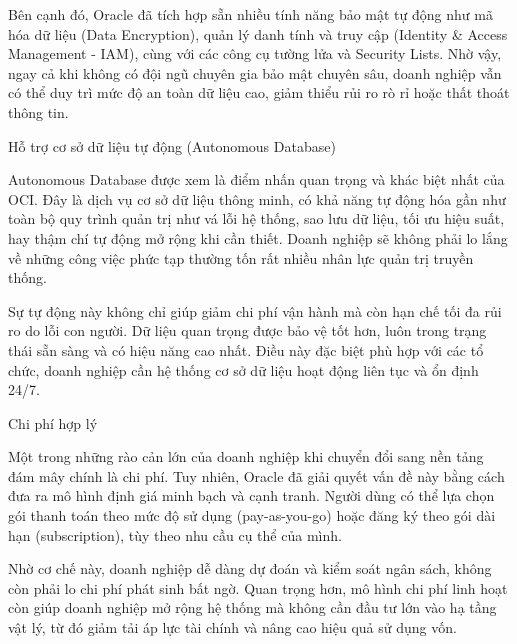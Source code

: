 \begin{myitem}
\begin{mysubitem}
    \item Bên cạnh đó, Oracle đã tích hợp sẵn nhiều tính năng bảo mật tự động như mã hóa dữ liệu (Data Encryption), quản lý danh tính và truy cập (Identity \& Access Management - IAM), cùng với các công cụ tường lửa và Security Lists. Nhờ vậy, ngay cả khi không có đội ngũ chuyên gia bảo mật chuyên sâu, doanh nghiệp vẫn có thể duy trì mức độ an toàn dữ liệu cao, giảm thiểu rủi ro rò rỉ hoặc thất thoát thông tin.
    
  \end{mysubitem}

\item Hỗ trợ cơ sở dữ liệu tự động (Autonomous Database)

  \begin{mysubitem}
    \item Autonomous Database được xem là điểm nhấn quan trọng và khác biệt nhất của OCI. Đây là dịch vụ cơ sở dữ liệu thông minh, có khả năng tự động hóa gần như toàn bộ quy trình quản trị như vá lỗi hệ thống, sao lưu dữ liệu, tối ưu hiệu suất, hay thậm chí tự động mở rộng khi cần thiết. Doanh nghiệp sẽ không phải lo lắng về những công việc phức tạp thường tốn rất nhiều nhân lực quản trị truyền thống.
    
    \item Sự tự động này không chỉ giúp giảm chi phí vận hành mà còn hạn chế tối đa rủi ro do lỗi con người. Dữ liệu quan trọng được bảo vệ tốt hơn, luôn trong trạng thái sẵn sàng và có hiệu năng cao nhất. Điều này đặc biệt phù hợp với các tổ chức, doanh nghiệp cần hệ thống cơ sở dữ liệu hoạt động liên tục và ổn định 24/7.
    
  \end{mysubitem}

\item Chi phí hợp lý

  \begin{mysubitem}
    \item Một trong những rào cản lớn của doanh nghiệp khi chuyển đổi sang nền tảng đám mây chính là chi phí. Tuy nhiên, Oracle đã giải quyết vấn đề này bằng cách đưa ra mô hình định giá minh bạch và cạnh tranh. Người dùng có thể lựa chọn gói thanh toán theo mức độ sử dụng (pay-as-you-go) hoặc đăng ký theo gói dài hạn (subscription), tùy theo nhu cầu cụ thể của mình.
    
    \item Nhờ cơ chế này, doanh nghiệp dễ dàng dự đoán và kiểm soát ngân sách, không còn phải lo chi phí phát sinh bất ngờ. Quan trọng hơn, mô hình chi phí linh hoạt còn giúp doanh nghiệp mở rộng hệ thống mà không cần đầu tư lớn vào hạ tầng vật lý, từ đó giảm tải áp lực tài chính và nâng cao hiệu quả sử dụng vốn.
    

\end{mysubitem}
\end{myitem}
